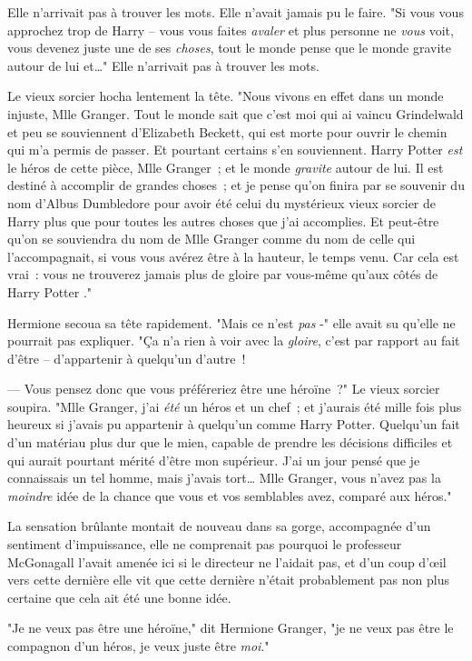 Elle n'arrivait pas à trouver les mots. Elle n'avait jamais pu le faire. "Si vous vous approchez trop de Harry -- vous vous faites \emph{avaler} et plus personne ne \emph{vous} voit, vous devenez juste une de ses \emph{choses}, tout le monde pense que le monde gravite autour de lui et…" Elle n'arrivait pas à trouver les mots.

Le vieux sorcier hocha lentement la tête. "Nous vivons en effet dans un monde injuste, Mlle Granger. Tout le monde sait que c'est moi qui ai vaincu Grindelwald et peu se souviennent d'Elizabeth Beckett, qui est morte pour ouvrir le chemin qui m'a permis de passer. Et pourtant certains s'en souviennent. Harry Potter \emph{est} le héros de cette pièce, Mlle Granger~; et le monde \emph{gravite} autour de lui. Il est destiné à accomplir de grandes choses~; et je pense qu'on finira par se souvenir du nom d'Albus Dumbledore pour avoir été celui du mystérieux vieux sorcier de Harry plus que pour toutes les autres choses que j'ai accomplies. Et peut-être qu'on se souviendra du nom de Mlle Granger comme du nom de celle qui l'accompagnait, si vous vous avérez être à la hauteur, le temps venu. Car cela est vrai~: vous ne trouverez jamais plus de gloire par vous-même qu'aux côtés de Harry Potter ."

Hermione secoua sa tête rapidement. "Mais ce n'est \emph{pas} -" elle avait su qu'elle ne pourrait pas expliquer. "Ça n'a rien à voir avec la \emph{gloire}, c'est par rapport au fait d'être -- d'appartenir à quelqu'un d'autre~!

--- Vous pensez donc que vous préféreriez être une héroïne~?" Le vieux sorcier soupira. "Mlle Granger, j'ai \emph{été} un héros et un chef~; et j'aurais été mille fois plus heureux si j'avais pu appartenir à quelqu'un comme Harry Potter. Quelqu'un fait d'un matériau plus dur que le mien, capable de prendre les décisions difficiles et qui aurait pourtant mérité d'être mon supérieur. J'ai un jour pensé que je connaissais un tel homme, mais j'avais tort… Mlle Granger, vous n'avez pas la \emph{moindre} idée de la chance que vous et vos semblables avez, comparé aux héros."

La sensation brûlante montait de nouveau dans sa gorge, accompagnée d'un sentiment d'impuissance, elle ne comprenait pas pourquoi le professeur McGonagall l'avait amenée ici si le directeur ne l'aidait pas, et d'un coup d'œil vers cette dernière elle vit que cette dernière n'était probablement pas non plus certaine que cela ait été une bonne idée.

"Je ne veux pas être une héroïne," dit Hermione Granger, "je ne veux pas être le compagnon d'un héros, je veux juste être \emph{moi}."

